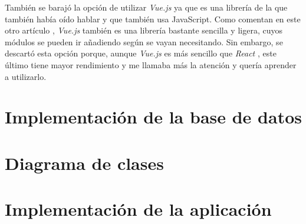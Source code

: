 También se barajó la opción de utilizar \textit{Vue.js} \cite{vuejs} ya que es una
librería de la que también había oído hablar y que también usa JavaScript.
Como comentan en este otro artículo \cite{vuejs-vs-react}, \textit{Vue.js} \cite{vuejs}
también es una librería bastante sencilla y ligera, cuyos módulos se pueden ir añadiendo
según se vayan necesitando. Sin embargo, se descartó esta opción porque, aunque
\textit{Vue.js} \cite{vuejs} es más sencillo que \textit{React} \cite{react}, este
último tiene mayor rendimiento y me llamaba más la atención y quería aprender a
utilizarlo.


\section{Implementación de la base de datos}

\section{Diagrama de clases}

\section{Implementación de la aplicación}
